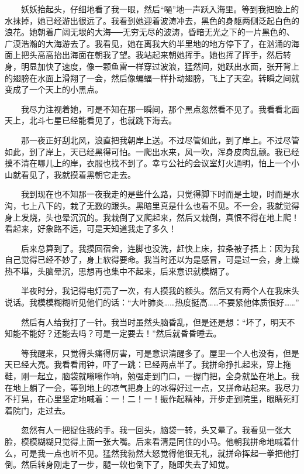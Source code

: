  　　妖妖抬起头，仔细地看了我一眼，然后“嗵”地一声跃入海里。等到我把脸上的水抹掉，她已经游出很远了。我看到她迎着波涛冲去，黑色的身躯两侧泛起白色的浪花。她朝着广阔无垠的大海──无穷无尽的波涛，昏暗无光之下的一片黑色的、广漠浩瀚的大海游去了。我看见，她在离我大约半里地的地方停下了，在汹涌的海面上把头高高抬出海面在朝我了望。我站起来朝她挥手。她也挥了挥手，然后转身，明显加快了速度，像一颗鱼雷一样穿过波浪，猛然间，她跃出水面，张开背上的翅膀在水面上滑翔了一会，然后像蝙蝠一样扑动翅膀，飞上了天空。转瞬之间就变成了一个天上的小黑点。 
 
 　　我尽力注视着她，可是不知在那一瞬间，那个黑点忽然看不见了。我看看北面天上，北斗七星已经能看见了，也就跳下海去。 
 
 　　那一夜正好刮北风，浪直把我朝岸上送。不过尽管如此，到了岸上。不过尽管如此，到了岸上，天已经黑得可怕。一爬出水来，风一吹，浑身皮肉乱颤。我已经摸不清在哪儿上的岸，衣服也找不到了。幸亏公社的会议室灯火通明，怕上一个小山就看见了，我就摸着黑朝它走去。 
 
 　　我到现在也不知那一夜我走的是些什么路，只觉得脚下时而是土埂，时而是水沟，七上八下的，栽了无数的跟头。黑暗里真是什么也看不见。不一会，我就觉得身上发烧，头也晕沉沉的。我栽倒了又爬起来，然后又栽倒，真恨不得在地上爬！看起来，好象路不远，可是天知道我走了多久！ 
 
 　　后来总算到了。我摸回宿舍，连脚也没洗，赶快上床，拉条被子捂上：因为我自己觉得已经不妙了，身上软得要命。我当时还以为是感冒，可是过一会，身上燥热不堪，头脑晕沉，思想再也集中不起来，后来意识就模糊了。 
 
 　　半夜时分，我记得电灯亮了一次，有人摸我的额头。然后又有两个人在我床头说话。我模模糊糊听见他们的话：“大叶肺炎……热度挺高……不要紧他体质很好……” 
 
 　　然后有人给我打了一针。我当时虽然头脑昏乱，但是还是想：“坏了，明天不知能不能好？还能去吗？可是一定要去！”然后就昏昏睡去。 
 
 　　等我醒来，只觉得头痛得厉害，可是意识清醒多了。屋里一个人也没有，但是天已经大亮。我看看闹钟，吓了一跳：已经两点半了。我拼命挣扎起来，穿上拖鞋，刚一起立，脑袋就嗡嗡作响，勉强走到门口，一握门把，全身就坠在地上。我在地上躺了一会，等到地上的凉气把身上的冰得好过一点，又拼命站起来。我尽力不打晃，在心里坚定地喊着：一！二！一！振作起精神，开步走到院里，眼睛死盯着院门，走过去。 
 
 　　忽然有人一把捉住我的手。我一回头，脑袋一转，头又晕了。我看见一张大脸，模模糊糊只觉得上面一张大嘴。后来看清是同住的小马。他朝我拼命地喊着什么，可是我一点也听不见。猛然我勃然大怒觉得他很无礼，就拼命挥起一拳把他打倒。然后转身刚走了一步，腿一软也倒下了，随即失去了知觉。 
 
